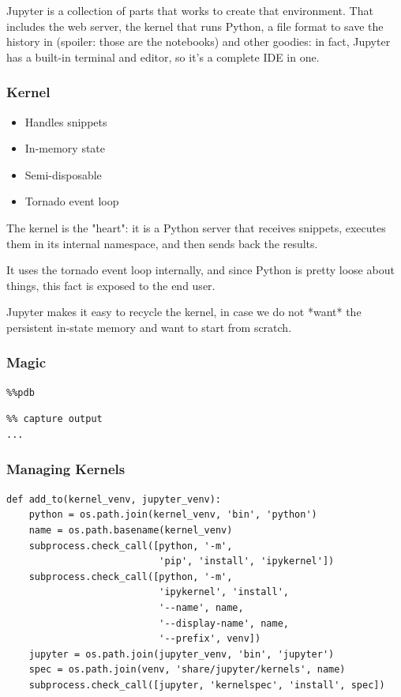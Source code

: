 Jupyter is a collection of parts that works to create that environment.
That includes the web server,
the kernel that runs Python,
a file format to save the history in
(spoiler: those are the notebooks)
and other goodies:
in fact,
Jupyter has a built-in terminal and editor,
so it's a complete IDE in one.

\begin{frame}
\frametitle{Kernel}

\begin{itemize}
\item Handles snippets
\item In-memory state
\item Semi-disposable
\item Tornado event loop
\end{itemize}

\end{frame}

The kernel is the "heart":
it is a Python server
that receives snippets,
executes them in its internal namespace,
and then sends back the results.

It uses the tornado event loop internally,
and since Python is pretty loose about things,
this fact is exposed to the end user.

Jupyter makes it easy to recycle the kernel,
in case we do not *want* the persistent
in-state memory
and want to start from scratch.

\begin{frame}[fragile]
\frametitle{Magic}

\begin{lstlisting}
%%pdb
\end{lstlisting}

\begin{lstlisting}
%% capture output
...
\end{lstlisting}

\end{frame}

\begin{frame}[fragile]
\frametitle{Managing Kernels}

\begin{lstlisting}
def add_to(kernel_venv, jupyter_venv):
    python = os.path.join(kernel_venv, 'bin', 'python')
    name = os.path.basename(kernel_venv)
    subprocess.check_call([python, '-m',
                           'pip', 'install', 'ipykernel'])
    subprocess.check_call([python, '-m',
                           'ipykernel', 'install',
                           '--name', name,
                           '--display-name', name,
                           '--prefix', venv])
    jupyter = os.path.join(jupyter_venv, 'bin', 'jupyter')
    spec = os.path.join(venv, 'share/jupyter/kernels', name)
    subprocess.check_call([jupyter, 'kernelspec', 'install', spec])
\end{lstlisting}
\end{frame}

